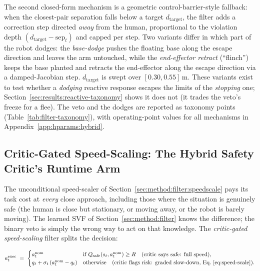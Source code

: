 \documentclass[11pt,a4paper]{report}
\begin{document}
The second closed-form mechanism is a geometric
control-barrier-style fallback: when the closest-pair separation
falls below a target $d_{\mathrm{target}}$, the filter adds a
correction step directed \emph{away} from the human, proportional to
the violation depth $(d_{\mathrm{target}} - \mathrm{sep}_t)$ and
capped per step. Two variants differ in which part of the robot
dodges: the \emph{base-dodge} pushes the floating base along the
escape direction and leaves the arm untouched, while the
\emph{end-effector retract} (``flinch'') keeps the base planted and
retracts the end-effector along the escape direction via a
damped-Jacobian step. $d_{\mathrm{target}}$ is swept over
$[0.30, 0.55]$\,m. These variants exist to test whether a
\emph{dodging} reactive response escapes the limits of the
\emph{stopping} one; Section~\ref{sec:results:reactive-taxonomy}
shows it does not (it trades the veto's freeze for a flee). The
veto and the dodges are reported as taxonomy points
(Table~\ref{tab:filter-taxonomy}), with operating-point values for
all mechanisms in Appendix~\ref{app:hparams:hybrid}.

\subsection{Critic-Gated Speed-Scaling: The Hybrid Safety Critic's Runtime Arm}
\label{sec:method:filter:gated}

The unconditional speed-scaler of
Section~\ref{sec:method:filter:speedscale} pays its task cost at
\emph{every} close approach, including those where the situation is
genuinely safe (the human is close but stationary, or moving away,
or the robot is barely moving). The learned SVF of
Section~\ref{sec:method:filter} knows the difference; the binary veto
is simply the wrong way to act on that knowledge. The
\emph{critic-gated speed-scaling} filter splits the decision:

\begin{equation}
  a^{\mathrm{exec}}_t \;=\;
  \begin{cases}
    a^{\mathrm{nom}}_t
      & \text{if } Q_{\mathrm{safe}}(s_t, a^{\mathrm{nom}}_t) \ge R
        \quad\text{(critic says safe: full speed)}, \\
    q_t + \sigma_t\,(a^{\mathrm{nom}}_t - q_t)
      & \text{otherwise}
        \quad\text{(critic flags risk: graded slow-down, Eq.~\ref{eq:speed-scale})}.
  \end{cases}
  \label{eq:gated-rule}
\end{equation}
\end{document}
